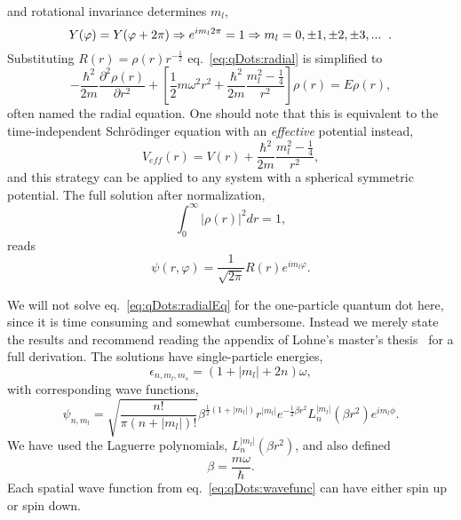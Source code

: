 and rotational invariance determines $m_l$,
\begin{equation}
Y(\varphi) = Y(\varphi + 2\pi) 
\Rightarrow 
e^{im_l 2\pi} = 1
\Rightarrow
m_l = 0,\pm 1,\pm 2, \pm 3, ...   \hspace{2mm}.
\end{equation}
Substituting $R(r) = \rho(r) r^{-\frac{1}{2}}$ eq.~\eqref{eq:qDots:radial} is simplified to
\begin{equation}
\label{eq:qDots:radialEq}
- \frac{\hbar^2}{2m} \frac{\partial^2 \rho(r)}{\partial r^2}
+
\left[
\frac{1}{2} m \omega^2 r^2 
+
\frac{\hbar^2}{2m} \frac{m_l^2 - \frac{1}{4}}{r^2}
\right]\rho(r)
=
E \rho(r) ,
\end{equation}
often named the radial equation.
One should note that this is equivalent to the time-independent Schrödinger equation with an \textit{effective} potential instead,
\begin{equation}
 V_{eff}(r) = V(r) +
\frac{\hbar^2}{2m} \frac{m_l^2 - \frac{1}{4}}{r^2},
\end{equation}
and this strategy can be applied to any system with a spherical symmetric potential.
The full solution after normalization,
\begin{equation}
\int_0^{\infty} |\rho(r) |^2 dr = 1,
\end{equation}
reads
\begin{equation}
\psi(r,\varphi) = \frac{1}{\sqrt{2\pi}} R(r)  e^{im_l \varphi}.
\end{equation}

We will not solve eq.~\eqref{eq:qDots:radialEq} for the one-particle quantum dot here, since it is time consuming and somewhat cumbersome.
Instead we merely state the results and recommend reading the appendix of Lohne's master's thesis~\cite{mplohne} for a full derivation.
The solutions have single-particle energies,
\begin{equation}
\label{eq:qDots:spEnergies}
\epsilon_{n,m_l,m_s} = \left( 1 + |m_l|  + 2 n\right) \omega ,
\end{equation}
with corresponding wave functions,
\begin{equation}
\label{eq:qDots:wavefunc}
\psi_{n,m_l} 
=
\sqrt{\frac{n!}{\pi \left( n + |m_l| \right) !}}
\beta^{\frac{1}{2}\left( 1 + |m_l|\right)}
r^{|m_l|}
e^{-\frac{1}{2}\beta r^2}
L_n^{|m_l|}\left( \beta r^2 \right)
e^{im_l\phi} .
\end{equation}
We have used the Laguerre polynomials, $L_n^{|m_l|}(\beta r^2)$, and also defined
\begin{equation}
\beta = \frac{m \omega}{\hbar}.
\end{equation}
Each spatial wave function from eq.~\eqref{eq:qDots:wavefunc} can have either spin up or spin down.





